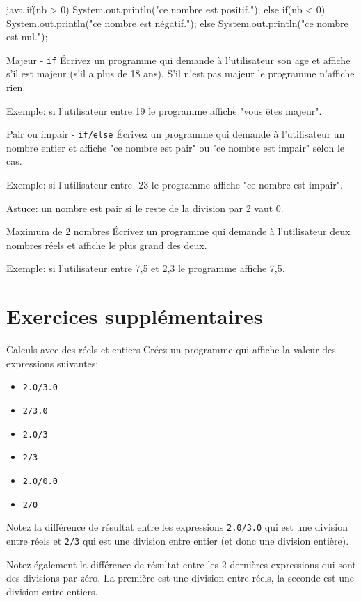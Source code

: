 \documentclass[a4paper,11pt]{article}
\begin{document}
	\begin{Code}{java}
		if(nb > 0) {
			System.out.println("ce nombre est positif.");
		} else if(nb < 0) {
			System.out.println("ce nombre est négatif.");
		} else {
			System.out.println("ce nombre est nul.");
		}
	\end{Code}

	
	\begin{Exercice}{Majeur - \texttt{if}}
		\'Ecrivez un programme qui demande à l'utilisateur 
		son age et affiche s'il est majeur (s'il a plus de 18 ans). 
		S'il n'est pas majeur le programme n'affiche rien.
		
		Exemple: si l'utilisateur entre 19 le programme affiche "vous êtes majeur". 
	\end{Exercice}

	\begin{Exercice}{Pair ou impair - \texttt{if/else}}
		\'Ecrivez un programme qui demande à l'utilisateur 
		un nombre entier et affiche "ce nombre est pair" ou "ce nombre est impair" selon le cas.
				
		Exemple: si l'utilisateur entre -23 le programme affiche "ce nombre est impair". 

		Astuce: un nombre est pair si le reste de la division par 2 vaut 0.
	\end{Exercice}

	\begin{Exercice}{Maximum de 2 nombres}
		\'Ecrivez un programme qui demande à l'utilisateur deux nombres réels
		et affiche le plus grand des deux.
		
		Exemple: si l'utilisateur entre 7,5 et 2,3 le programme affiche 7,5. 
	\end{Exercice}
	
	
	
\section{Exercices supplémentaires}


	\begin{Exercice}{Calculs avec des réels et entiers}
		Créez un programme qui affiche la valeur des expressions suivantes:
	
		\begin{itemize}		
			\item \texttt{2.0/3.0}
			\item \texttt{2/3.0}
			\item \texttt{2.0/3}
			\item \texttt{2/3}
			\item \texttt{2.0/0.0}
			\item \texttt{2/0}
		\end{itemize}
	
		Notez la différence de résultat entre les expressions \texttt{2.0/3.0} qui est une division entre réels 
		et \texttt{2/3} qui est une division entre entier (et donc une division entière).
	
		Notez également la différence de résultat entre les 2 dernières expressions qui sont des divisions par zéro.
		La première est une division entre réels,
		la seconde est une division entre entiers.
	\end{Exercice}
	
\end{document}

